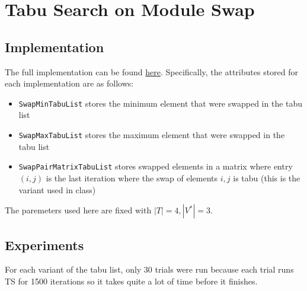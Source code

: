 \section{Tabu Search on Module Swap}

\subsection{Implementation}

The full implementation can be found \href{https://github.com/nngerncham/ma395_heuristic/blob/main/homework/hw3/codebase/Notebooks/Problem\%203.ipynb}{here}. Specifically, the attributes stored for each implementation are as follows:
\begin{itemize}
    \item \texttt{SwapMinTabuList} stores the minimum element that were swapped in the tabu list
    \item \texttt{SwapMaxTabuList} stores the maximum element that were swapped in the tabu list
    \item \texttt{SwapPairMatrixTabuList} stores swapped elements in a matrix where entry \((i, j)\) is the last iteration where the swap of elements \(i, j\) is tabu (this is the variant used in class)
\end{itemize}
The paremeters used here are fixed with \(|T| = 4, |V^*|=3\).

\subsection{Experiments}

For each variant of the tabu list, only 30 trials were run because each trial runs TS for 1500 iterations so it takes quite a lot of time before it finishes.

